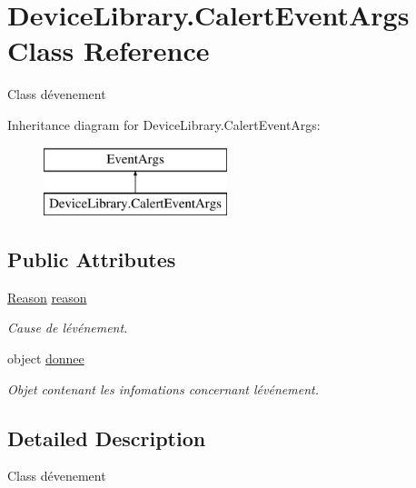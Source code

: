 \hypertarget{class_device_library_1_1_calert_event_args}{}\section{Device\+Library.\+Calert\+Event\+Args Class Reference}
\label{class_device_library_1_1_calert_event_args}


Class d\textquotesingle{}évenement  


Inheritance diagram for Device\+Library.\+Calert\+Event\+Args\+:\begin{figure}[H]
\begin{center}
\leavevmode
\includegraphics[height=2.000000cm]{class_device_library_1_1_calert_event_args}
\end{center}
\end{figure}
\subsection*{Public Attributes}
\begin{DoxyCompactItemize}
\item 
\mbox{\hyperlink{namespace_device_library_aecf5c8419c6482aed0b21decb1663754}{Reason}} \mbox{\hyperlink{class_device_library_1_1_calert_event_args_aefae78e9a96d2a95656c21c6e27fe2e6}{reason}}
\begin{DoxyCompactList}\small\item\em Cause de l\textquotesingle{}événement. \end{DoxyCompactList}\item 
object \mbox{\hyperlink{class_device_library_1_1_calert_event_args_a8af6a2546770e991696afd97029e57ff}{donnee}}
\begin{DoxyCompactList}\small\item\em Objet contenant les infomations concernant l\textquotesingle{}événement. \end{DoxyCompactList}\end{DoxyCompactItemize}


\subsection{Detailed Description}
Class d\textquotesingle{}évenement 



